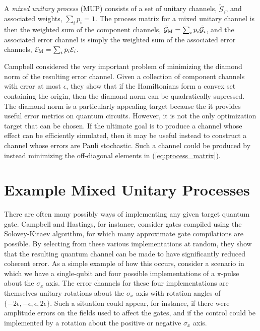 \documentclass[aps,nofootinbib,pra,notitlepage,twocolumn]{revtex4-1}
\newcommand{\actual}{\ensuremath{\tilde{\mathcal{G}}}}
\newcommand{\error}{\ensuremath{{\mathcal{E}}}}
\begin{document}
A \textit{mixed unitary process} (MUP) consists of a set of unitary channels, $\actual_i$, and associated weights, $\sum_i p_i = 1$.  The process matrix for a mixed unitary channel is then the weighted sum of the component channels, $\actual_{\rm M} = \sum_i p_i \actual_i$, and the associated error channel is simply the weighted sum of the associated error channels, $\error_{\rm M} = \sum_i p_i \error_i$. 

Campbell\cite{Campbell2017} considered the very important problem of minimizing the diamond norm of the resulting error channel. Given a collection of component channels with error at most $\epsilon$, they show that if the Hamiltonians form a convex set containing the origin, then the diamond norm can be quadratically supressed. The diamond norm is a particularly appealing target because the it provides useful error metrics on quantum circuits. However, it is not the only optimization target that can be chosen. If the ultimate goal is to produce a channel whose effect can be efficiently simulated, then it may be useful instead to construct a channel whose errors are Pauli stochastic. Such a channel could be produced by instead minimizing the off-diagonal elements in (\ref{eq:process_matrix}).


\section{Example Mixed Unitary Processes}
\label{sec:mixed_unitary_processes}
There are often many possibly ways of implementing any given target quantum gate. Campbell and Hastings, for instance, consider gates compiled using the Solovey-Kitaev algorithm, for which many approximate gate compilations are possible.\cite{Campbell2017, 1612.01011} By selecting from these various implementations at random, they show that the resulting quantum channel can be made to have significantly reduced coherent error.  As a simple example of how this occurs, consider a scenario in which we have a single-qubit and four possible implementations of a $\pi$-pulse about the $\sigma_x$ axis. The error channels for these four implementations are themselves unitary rotations about the $\sigma_x$ axis with rotation angles of $\{-2\epsilon, -\epsilon, \epsilon, 2\epsilon\}$. Such a situation could appear, for instance, if there were amplitude errors on the fields used to affect the gates, and if the control could be implemented by a rotation about the positive or negative $\sigma_x$ axis.
\end{document}
